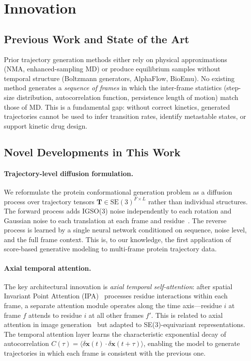 \documentclass[12pt,letterpaper]{article}
\begin{document}
\section{Innovation}

\subsection*{Previous Work and State of the Art}
Prior trajectory generation methods either rely on physical approximations (NMA, enhanced-sampling MD) or produce equilibrium samples without temporal structure (Boltzmann generators, AlphaFlow, BioEmu). No existing method generates a \emph{sequence of frames} in which the inter-frame statistics (step-size distribution, autocorrelation function, persistence length of motion) match those of MD. This is a fundamental gap: without correct kinetics, generated trajectories cannot be used to infer transition rates, identify metastable states, or support kinetic drug design.

\subsection*{Novel Developments in This Work}

\paragraph{Trajectory-level diffusion formulation.}
We reformulate the protein conformational generation problem as a diffusion process over trajectory tensors $\mathbf{T} \in \text{SE}(3)^{F\times L}$ rather than individual structures. The forward process adds IGSO(3) noise independently to each rotation and Gaussian noise to each translation at each frame and residue~\cite{leach2022denoising,yim2023framediff}. The reverse process is learned by a single neural network conditioned on sequence, noise level, and the full frame context. This is, to our knowledge, the first application of score-based generative modeling to multi-frame protein trajectory data.

\paragraph{Axial temporal attention.}
The key architectural innovation is \emph{axial temporal self-attention}: after spatial Invariant Point Attention (IPA)~\cite{jumper2021alphafold} processes residue interactions within each frame, a separate attention module operates along the time axis—residue $i$ at frame $f$ attends to residue $i$ at all other frames $f'$. This is related to axial attention in image generation~\cite{ho2019axial} but adapted to SE(3)-equivariant representations. The temporal attention layer learns the characteristic exponential decay of autocorrelation $C(\tau) = \langle\delta\mathbf{x}(t)\cdot\delta\mathbf{x}(t+\tau)\rangle$, enabling the model to generate trajectories in which each frame is consistent with the previous one.
\end{document}
